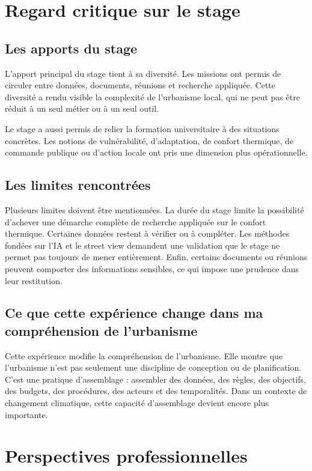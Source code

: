 \documentclass[11pt,a4paper]{report}
\begin{document}
\section{Regard critique sur le stage}

\subsection{Les apports du stage}

L'apport principal du stage tient à sa diversité. Les missions ont permis de circuler entre données, documents, réunions et recherche appliquée. Cette diversité a rendu visible la complexité de l'urbanisme local, qui ne peut pas être réduit à un seul métier ou à un seul outil.

Le stage a aussi permis de relier la formation universitaire à des situations concrètes. Les notions de vulnérabilité, d'adaptation, de confort thermique, de commande publique ou d'action locale ont pris une dimension plus opérationnelle.

\subsection{Les limites rencontrées}

Plusieurs limites doivent être mentionnées. La durée du stage limite la possibilité d'achever une démarche complète de recherche appliquée sur le confort thermique. Certaines données restent à vérifier ou à compléter. Les méthodes fondées sur l'IA et le street view demandent une validation que le stage ne permet pas toujours de mener entièrement. Enfin, certains documents ou réunions peuvent comporter des informations sensibles, ce qui impose une prudence dans leur restitution.

\subsection{Ce que cette expérience change dans ma compréhension de l'urbanisme}

Cette expérience modifie la compréhension de l'urbanisme. Elle montre que l'urbanisme n'est pas seulement une discipline de conception ou de planification. C'est une pratique d'assemblage : assembler des données, des règles, des objectifs, des budgets, des procédures, des acteurs et des temporalités. Dans un contexte de changement climatique, cette capacité d'assemblage devient encore plus importante.

\section{Perspectives professionnelles}
\end{document}
